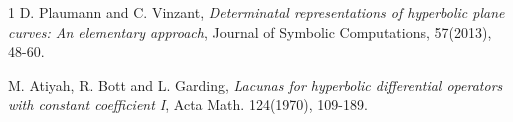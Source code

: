 \documentclass[10pt,a4paper,reqno]{amsart}
\begin{document}
\begin{thebibliography}{1}
D. Plaumann and C. Vinzant,\textit{ Determinatal representations of hyperbolic
plane curves: An elementary approach}, Journal of Symbolic Computations,
57(2013), 48-60.

M. Atiyah, R. Bott and L. Garding, \textit{Lacunas for hyperbolic differential
operators with constant coefficient I}, Acta Math. 124(1970), 109-189.







\end{thebibliography}
\end{document}
